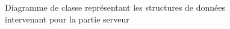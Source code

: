\documentclass[a4paper]{report}
\begin{document}
\newpage
\begin{figure}[H]
    \vspace*{-3cm}
    \caption{\label{3} Diagramme de classe représentant les structures de données intervenant pour la partie serveur}
\end{figure}
\end{document}

